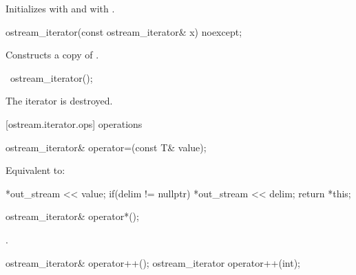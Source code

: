 \begin{itemdescr}
\pnum
\effects
Initializes  with  and  with .
\end{itemdescr}

%
\begin{itemdecl}
ostream_iterator(const ostream_iterator& x) noexcept;
\end{itemdecl}

\begin{itemdescr}
\pnum
\effects
Constructs a copy of .
\end{itemdescr}

%
\begin{itemdecl}
~ostream_iterator();
\end{itemdecl}

\begin{itemdescr}
\pnum
\effects
The iterator is destroyed.
\end{itemdescr}

[ostream.iterator.ops]{ operations}

%
%
\begin{itemdecl}
ostream_iterator& operator=(const T& value);
\end{itemdecl}

\begin{itemdescr}
\pnum
\effects Equivalent to:
\begin{codeblock}
*out_stream << value;
if(delim != nullptr)
  *out_stream << delim;
return *this;
\end{codeblock}
\end{itemdescr}

%
%
\begin{itemdecl}
ostream_iterator& operator*();
\end{itemdecl}

\begin{itemdescr}
\pnum
\returns
{}.
\end{itemdescr}

%
%
\begin{itemdecl}
ostream_iterator& operator++();
ostream_iterator operator++(int);
\end{itemdecl}

